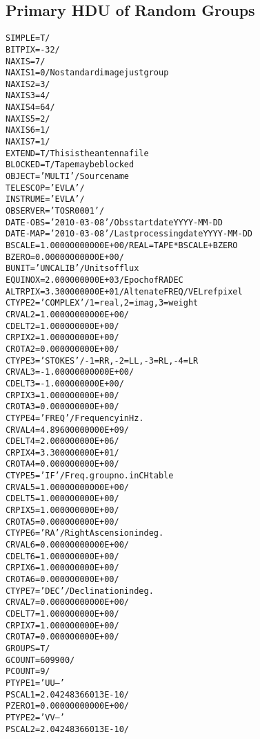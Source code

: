 \documentclass[twoside]{article}
\begin{document}
\subsection{Primary HDU of Random Groups}
\label{Appe:HDUrangrp}
\small
\begin{alltt}
SIMPLE  =                    T /
BITPIX  =                  -32 /
NAXIS   =                    7 /
NAXIS1  =                    0 /No standard image just group
NAXIS2  =                    3 /
NAXIS3  =                    4 /
NAXIS4  =                   64 /
NAXIS5  =                    2 /
NAXIS6  =                    1 /
NAXIS7  =                    1 /
EXTEND  =                    T /This is the antenna file
BLOCKED =                    T /Tape may be blocked
OBJECT  = 'MULTI   '           /Source name
TELESCOP= 'EVLA    '           /
INSTRUME= 'EVLA    '           /
OBSERVER= 'TOSR0001'           /
DATE-OBS= '2010-03-08'         /Obs start date YYYY-MM-DD
DATE-MAP= '2010-03-08'         /Last processing date YYYY-MM-DD
BSCALE  =    1.00000000000E+00 /REAL = TAPE * BSCALE + BZERO
BZERO   =    0.00000000000E+00 /
BUNIT   = 'UNCALIB '           /Units of flux
EQUINOX =      2.000000000E+03 /Epoch of RA DEC
ALTRPIX =      3.300000000E+01 /Altenate FREQ/VEL ref pixel
CTYPE2  = 'COMPLEX '           /1=real,2=imag,3=weight
CRVAL2  =    1.00000000000E+00 /
CDELT2  =      1.000000000E+00 /
CRPIX2  =      1.000000000E+00 /
CROTA2  =      0.000000000E+00 /
CTYPE3  = 'STOKES  '           /-1=RR, -2=LL, -3=RL, -4=LR
CRVAL3  =   -1.00000000000E+00 /
CDELT3  =     -1.000000000E+00 /
CRPIX3  =      1.000000000E+00 /
CROTA3  =      0.000000000E+00 /
CTYPE4  = 'FREQ    '           /Frequency in Hz.
CRVAL4  =    4.89600000000E+09 /
CDELT4  =      2.000000000E+06 /
CRPIX4  =      3.300000000E+01 /
CROTA4  =      0.000000000E+00 /
CTYPE5  = 'IF      '           /Freq. group no. in CH table
CRVAL5  =    1.00000000000E+00 /
CDELT5  =      1.000000000E+00 /
CRPIX5  =      1.000000000E+00 /
CROTA5  =      0.000000000E+00 /
CTYPE6  = 'RA      '           /Right Ascension in deg.
CRVAL6  =    0.00000000000E+00 /
CDELT6  =      1.000000000E+00 /
CRPIX6  =      1.000000000E+00 /
CROTA6  =      0.000000000E+00 /
CTYPE7  = 'DEC     '           /Declination in deg.
CRVAL7  =    0.00000000000E+00 /
CDELT7  =      1.000000000E+00 /
CRPIX7  =      1.000000000E+00 /
CROTA7  =      0.000000000E+00 /
GROUPS  =                    T /
GCOUNT  =               609900 /
PCOUNT  =                    9 /
PTYPE1  = 'UU--    '
PSCAL1  =    2.04248366013E-10 /
PZERO1  =    0.00000000000E+00 /
PTYPE2  = 'VV--    '
PSCAL2  =    2.04248366013E-10 /

\end{alltt}
\end{document}
